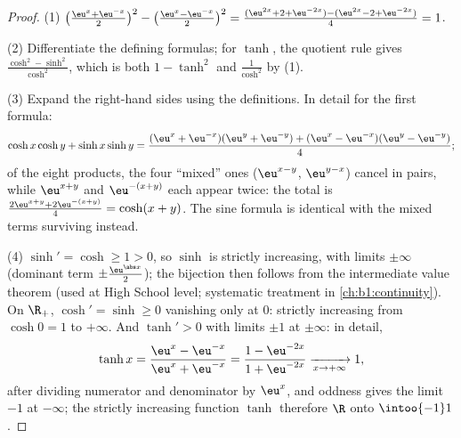 \begin{proof}
(1) $\bigl(\frac{\eu^x + \eu^{-x}}{2}\bigr)^2 - \bigl(\frac{\eu^x -
\eu^{-x}}{2}\bigr)^2 = \frac{(\eu^{2x} + 2 + \eu^{-2x}) - (\eu^{2x} -
2 + \eu^{-2x})}{4} = 1$.

(2) Differentiate the defining formulas; for $\tanh$, the quotient
rule gives $\frac{\cosh^2 - \sinh^2}{\cosh^2}$, which is both
$1 - \tanh^2$ and $\frac{1}{\cosh^2}$ by (1).

(3) Expand the right-hand sides using the definitions. In detail
for the first formula:
\[
\cosh x\cosh y + \sinh x\sinh y
= \frac{(\eu^x + \eu^{-x})(\eu^y + \eu^{-y})
+ (\eu^x - \eu^{-x})(\eu^y - \eu^{-y})}{4} ;
\]
of the eight products, the four ``mixed'' ones
($\eu^{x-y}$, $\eu^{y-x}$) cancel in pairs, while
$\eu^{x+y}$ and $\eu^{-(x+y)}$ each appear twice:
the total is $\frac{2\eu^{x+y} + 2\eu^{-(x+y)}}{4} = \cosh(x+y)$.
The sine formula is identical with the mixed terms surviving
instead.

(4) $\sinh' = \cosh \geq 1 > 0$, so $\sinh$ is strictly increasing,
with limits $\pm\infty$ (dominant term $\pm\frac{\eu^{\abs
x}}{2}$); the bijection  then follows from the intermediate
value theorem (used at High School level; systematic treatment in
\cref{ch:b1:continuity}). On $\R_+$, $\cosh' = \sinh \geq 0$
vanishing only at $0$: strictly increasing from $\cosh 0 = 1$ to
$+\infty$. And $\tanh' > 0$ with limits $\pm 1$ at $\pm\infty$: in
detail,
\[
\tanh x = \frac{\eu^x - \eu^{-x}}{\eu^x + \eu^{-x}}
= \frac{1 - \eu^{-2x}}{1 + \eu^{-2x}}
\xrightarrow[x \to +\infty]{} 1 ,
\]
after dividing numerator and denominator by $\eu^x$, and oddness
gives the limit $-1$ at $-\infty$; the strictly increasing
function $\tanh$ therefore  $\R$ onto $\intoo{-1}1$.
\end{proof}

